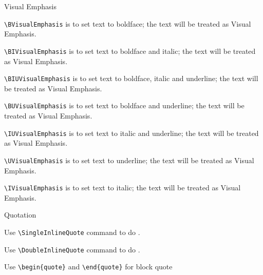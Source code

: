 \documentclass[12pt,Bold,letterpaper,TexShade]{mcgilletdclass}
\begin{document}
\begin{BulletList}
		\item{Visual Emphasis}
		\begin{romanList}
			\item{ \verb=\BVisualEmphasis= is to set text to boldface; the text will be treated as Visual Emphasis}.
			\item{ \verb=\BIVisualEmphasis= is to set text to boldface and italic; the text will be treated as Visual Emphasis}.
			\item{ \verb=\BIUVisualEmphasis= is to set text to boldface, italic and underline; the text will be treated as Visual Emphasis}.
			\item{ \verb=\BUVisualEmphasis= is to set text to boldface and underline; the text will be treated as Visual Emphasis}.
			\item{ \verb=\IUVisualEmphasis= is to set text to italic and underline; the text will be treated as Visual Emphasis}.
			\item{ \verb=\UVisualEmphasis= is to set text to underline; the text will be treated as Visual Emphasis}.
			\item{ \verb=\IVisualEmphasis= is to set text to italic; the text will be treated as Visual Emphasis}.
		\end{romanList}
		
		\item{Quotation}
			\begin{romanList}
			\item{Use \verb=\SingleInlineQuote= command to do . }
			\item{Use \verb=\DoubleInlineQuote= command to do . }
			\item{Use \verb=\begin{quote}= and \verb=\end{quote}= for block quote}
			\end{romanList}


\end{BulletList}
\end{document}

